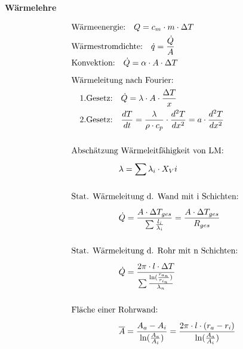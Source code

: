 \begin{minipage}[t]{.45\textwidth}
\vspace*{5.5mm}
\textbf{Wärmelehre} \par \vspace*{-4mm}
\begin{align*}
&\text{Wärmeenergie:} \quad Q = c_m \cdot m \cdot \Delta T \\
&\text{Wärmestromdichte:} \quad \dot{q} = \frac{\dot{Q}}{A} \\
&\text{Konvektion:} \quad \dot{Q} = \alpha \cdot A \cdot \Delta T \\[6pt] 
&\text{Wärmeleitung nach Fourier:}\\
&\quad \text{1.Gesetz:} \quad \dot{Q} = \lambda \cdot A \cdot \frac{\Delta T}{x} \\
&\quad \text{2.Gesetz:} \quad \frac{dT}{dt} = \frac{\lambda}{\rho \cdot c_p} \cdot \frac{d^2T}{dx^2} = a \cdot \frac{d^2T}{dx^2} \\ \\
&\text{Abschätzung Wärmeleitfähigkeit von LM:}\\[4pt]
& \hspace*{2cm} \lambda = \sum \lambda_i \cdot X_Vi \\ \\
&\text{Stat. Wärmeleitung d. Wand mit i Schichten:}\\[4pt]
&\hspace*{2cm} \dot{Q} = \frac{A \cdot \Delta T_{ges}}{\sum \frac{l_i}{\lambda_i}} = \frac{A \cdot \Delta T_{ges}}{R_{ges}}\\ \\
&\text{Stat. Wärmeleitung d. Rohr mit n Schichten:}\\[4pt]
&\hspace*{2cm} \dot{Q} = \frac{2 \pi \cdot l \cdot \Delta T }{\sum \frac{\ln(\frac{r_{a_n}}{r_{i_n}})}{\lambda_n}} \\ \\
&\text{Fläche einer Rohrwand:}\\[4pt]
& \hspace*{2cm} \overline{A} = \frac{A_a - A_i}{\ln(\frac{A_a}{A_i})} = \frac{2 \pi \cdot l \cdot (r_a - r_i)}{\ln(\frac{A_a}{A_i})} \\
\end{align*}



\end{minipage}
